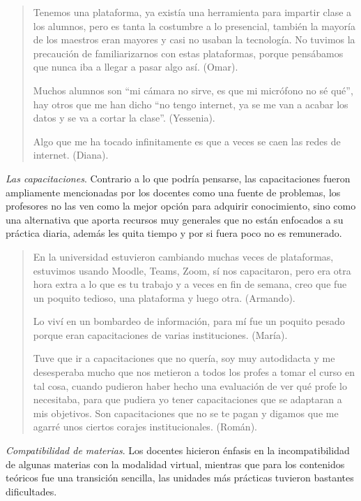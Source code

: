 \documentclass[spanish]{textolivre}
\begin{document}
\begin{quote}
    Tenemos una plataforma, ya existía una herramienta para impartir clase a los alumnos, pero es tanta la costumbre a lo presencial, también la mayoría de los maestros eran mayores y casi no usaban la tecnología. No tuvimos la precaución de familiarizarnos con estas plataformas, porque pensábamos que nunca iba a llegar a pasar algo así. (Omar).

    Muchos alumnos son “mi cámara no sirve, es que mi micrófono no sé qué”, hay otros que me han dicho “no tengo internet, ya se me van a acabar los datos y se va a cortar la clase”. (Yessenia).

    Algo que me ha tocado infinitamente es que a veces se caen las redes de internet. (Diana).
\end{quote}

\textit{Las capacitaciones}. Contrario a lo que podría pensarse, las capacitaciones fueron ampliamente mencionadas por los docentes como una fuente de problemas, los profesores no las ven como la mejor opción para adquirir conocimiento, sino como una alternativa que aporta recursos muy generales que no están enfocados a su práctica diaria, además les quita tiempo y por si fuera poco no es remunerado.

\begin{quote}
    En la universidad estuvieron cambiando muchas veces de plataformas, estuvimos usando Moodle, Teams, Zoom, sí nos capacitaron, pero era otra hora extra a lo que es tu trabajo y a veces en fin de semana, creo que fue un poquito tedioso, una plataforma y luego otra. (Armando).

    Lo viví en un bombardeo de información, para mí fue un poquito pesado porque eran capacitaciones de varias instituciones. (María).

    Tuve que ir a capacitaciones que no quería, soy muy autodidacta y me desesperaba mucho que nos metieron a todos los profes a tomar el curso en tal cosa, cuando pudieron haber hecho una evaluación de ver qué profe lo necesitaba, para que pudiera yo tener capacitaciones que se adaptaran a mis objetivos. Son capacitaciones que no se te pagan y digamos que me agarré unos ciertos corajes institucionales. (Román).
\end{quote}

\textit{Compatibilidad de materias}. Los docentes hicieron énfasis en la incompatibilidad de algunas materias con la modalidad virtual, mientras que para los contenidos teóricos fue una transición sencilla, las unidades más prácticas tuvieron bastantes dificultades. 
\end{document}
